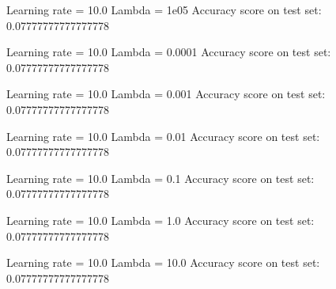 \documentclass[letterpaper,10pt,english]{sphinxmanual}
\begin{document}
\begin{sphinxVerbatim}[commandchars=\\\{\}]
Learning rate  =  10.0
Lambda =  1e\PYGZhy{}05
Accuracy score on test set:  0.07777777777777778
\end{sphinxVerbatim}

\begin{sphinxVerbatim}[commandchars=\\\{\}]
Learning rate  =  10.0
Lambda =  0.0001
Accuracy score on test set:  0.07777777777777778
\end{sphinxVerbatim}

\begin{sphinxVerbatim}[commandchars=\\\{\}]
Learning rate  =  10.0
Lambda =  0.001
Accuracy score on test set:  0.07777777777777778
\end{sphinxVerbatim}

\begin{sphinxVerbatim}[commandchars=\\\{\}]
Learning rate  =  10.0
Lambda =  0.01
Accuracy score on test set:  0.07777777777777778
\end{sphinxVerbatim}

\begin{sphinxVerbatim}[commandchars=\\\{\}]
Learning rate  =  10.0
Lambda =  0.1
Accuracy score on test set:  0.07777777777777778
\end{sphinxVerbatim}

\begin{sphinxVerbatim}[commandchars=\\\{\}]
Learning rate  =  10.0
Lambda =  1.0
Accuracy score on test set:  0.07777777777777778
\end{sphinxVerbatim}

\begin{sphinxVerbatim}[commandchars=\\\{\}]
Learning rate  =  10.0
Lambda =  10.0
Accuracy score on test set:  0.07777777777777778
\end{sphinxVerbatim}
\end{document}
